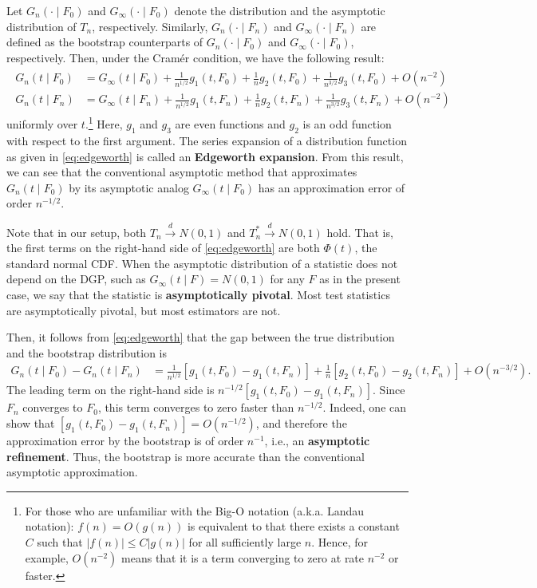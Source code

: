 \documentclass[11pt, A4paper, openany, uplatex]{book}
\begin{document}
Let $G_n(\cdot \mid F_0)$ and $G_\infty(\cdot \mid F_0)$ denote the distribution and the asymptotic distribution of $T_n$, respectively.
Similarly, $G_n(\cdot \mid F_n)$ and $G_\infty(\cdot \mid F_n)$ are defined as the bootstrap counterparts of $G_n(\cdot \mid F_0)$ and $G_\infty(\cdot \mid F_0)$, respectively.
Then, under the Cram\'er condition, we have the following result:
\begin{align}\label{eq:edgeworth}
	\begin{split}
		G_n(t \mid F_0) & = G_\infty(t \mid F_0) + \frac{1}{n^{1/2}} g_1(t, F_0) + \frac{1}{n} g_2(t, F_0) + \frac{1}{n^{3/2}} g_3(t, F_0) + O(n^{-2}) \\
		G_n(t \mid F_n) & = G_\infty(t \mid F_n) + \frac{1}{n^{1/2}} g_1(t, F_n) + \frac{1}{n} g_2(t, F_n) + \frac{1}{n^{3/2}} g_3(t, F_n) + O(n^{-2}) 
	\end{split}
\end{align}
uniformly over $t$.\footnote{
	For those who are unfamiliar with the Big-O notation (a.k.a. Landau notation): $f(n) = O(g(n))$ is equivalent to that there exists a constant $C$ such that $|f(n)| \le C |g(n)|$ for all sufficiently large $n$.
	Hence, for example, $O(n^{-2})$ means that it is a term converging to zero at rate $n^{-2}$ or faster.
}
Here, $g_1$ and $g_3$ are even functions and $g_2$ is an odd function with respect to the first argument.
The series expansion of a distribution function as given in \eqref{eq:edgeworth} is called an \textbf{Edgeworth expansion}.
From this result, we can see that the conventional asymptotic method that approximates $G_n(t \mid F_0)$ by its asymptotic analog $G_\infty(t \mid F_0)$ has an approximation error of order $n^{-1/2}$.

Note that in our setup, both $T_n \overset{d}{\to} N(0,1)$ and $T_n^* \overset{d}{\to} N(0,1)$ hold.
That is, the first terms on the right-hand side of \eqref{eq:edgeworth} are both $\Phi(t)$, the standard normal CDF.
When the asymptotic distribution of a statistic does not depend on the DGP, such as $G_\infty(t \mid F) = N(0,1)$ for any $F$ as in the present case, we say that the statistic is \textbf{asymptotically pivotal}.
Most test statistics are asymptotically pivotal, but most estimators are not.

Then, it follows from \eqref{eq:edgeworth} that the gap between the true distribution and the bootstrap distribution is 
\begin{align*}
	G_n(t \mid F_0) - G_n(t \mid F_n) 
	& = \frac{1}{n^{1/2}}[g_1(t, F_0) - g_1(t, F_n)] + \frac{1}{n}[g_2(t, F_0) - g_2(t, F_n)] + O(n^{-3/2}).
\end{align*}
The leading term on the right-hand side is $n^{-1/2}[g_1(t, F_0) - g_1(t, F_n)]$.
Since $F_n$ converges to $F_0$, this term converges to zero faster than $n^{-1/2}$.
Indeed, one can show that $[g_1(t, F_0) - g_1(t, F_n)] = O(n^{-1/2})$, and therefore the approximation error by the bootstrap is of order $n^{-1}$, i.e., an \textbf{asymptotic refinement}.
Thus, the bootstrap is more accurate than the conventional asymptotic approximation.
\bigskip
\end{document}
